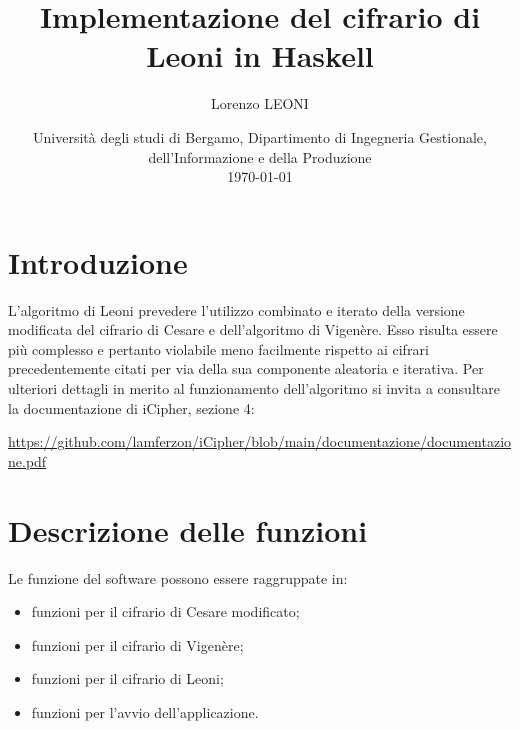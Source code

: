 \documentclass[a4paper, 12pt, one column, aas_macros]{article}
\title{Implementazione del cifrario di Leoni in Haskell}
\author{Lorenzo LEONI}
\date{%
	Università degli studi di Bergamo, Dipartimento di Ingegneria Gestionale, dell'Informazione e della Produzione\\[2ex]%
	\today
}
\begin{document}
	\maketitle
	\section{Introduzione}
	L'algoritmo di Leoni prevedere l'utilizzo combinato e iterato della versione modificata del cifrario di Cesare  e dell'algoritmo di Vigenère. Esso risulta essere più complesso e pertanto violabile meno facilmente rispetto ai cifrari precedentemente citati per via della sua componente aleatoria e iterativa. Per ulteriori dettagli in merito al funzionamento dell'algoritmo si invita a consultare la documentazione di iCipher, sezione \num{4}:
	\begin{center}
		\url{https://github.com/lamferzon/iCipher/blob/main/documentazione/documentazione.pdf}
	\end{center}
	
	\section{Descrizione delle funzioni}
	Le funzione del software possono essere raggruppate in:
	\begin{itemize}
		\item funzioni per il cifrario di Cesare modificato;
		\item funzioni per il cifrario di Vigenère;
		\item funzioni per il cifrario di Leoni;
		\item funzioni per l'avvio dell'applicazione.
	\end{itemize}
\end{document}
